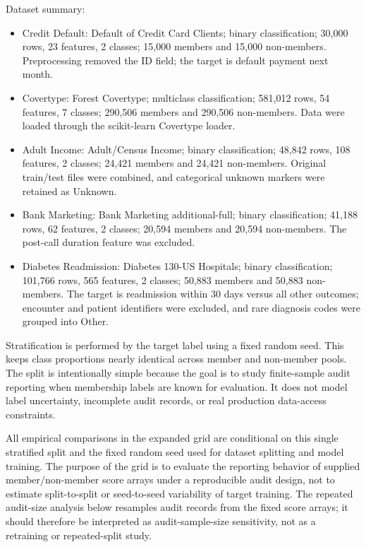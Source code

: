 \documentclass[
  10pt,
  twocolumn]{article}
\providecommand{\tightlist}{%
  \setlength{\itemsep}{0pt}\setlength{\parskip}{0pt}}
\begin{document}
Dataset summary:

\begin{itemize}
\tightlist
\item
  Credit Default: Default of Credit Card Clients; binary classification; 30,000 rows, 23 features, 2 classes; 15,000 members and 15,000 non-members. Preprocessing removed the ID field; the target is default payment next month.
\item
  Covertype: Forest Covertype; multiclass classification; 581,012 rows, 54 features, 7 classes; 290,506 members and 290,506 non-members. Data were loaded through the scikit-learn Covertype loader.
\item
  Adult Income: Adult/Census Income; binary classification; 48,842 rows, 108 features, 2 classes; 24,421 members and 24,421 non-members. Original train/test files were combined, and categorical unknown markers were retained as Unknown.
\item
  Bank Marketing: Bank Marketing additional-full; binary classification; 41,188 rows, 62 features, 2 classes; 20,594 members and 20,594 non-members. The post-call duration feature was excluded.
\item
  Diabetes Readmission: Diabetes 130-US Hospitals; binary classification; 101,766 rows, 565 features, 2 classes; 50,883 members and 50,883 non-members. The target is readmission within 30 days versus all other outcomes; encounter and patient identifiers were excluded, and rare diagnosis codes were grouped into Other.
\end{itemize}

Stratification is performed by the target label using a fixed random seed. This keeps class proportions nearly identical across member and non-member pools. The split is intentionally simple because the goal is to study finite-sample audit reporting when membership labels are known for evaluation. It does not model label uncertainty, incomplete audit records, or real production data-access constraints.

All empirical comparisons in the expanded grid are conditional on this single stratified split and the fixed random seed used for dataset splitting and model training. The purpose of the grid is to evaluate the reporting behavior of supplied member/non-member score arrays under a reproducible audit design, not to estimate split-to-split or seed-to-seed variability of target training. The repeated audit-size analysis below resamples audit records from the fixed score arrays; it should therefore be interpreted as audit-sample-size sensitivity, not as a retraining or repeated-split study.
\end{document}
